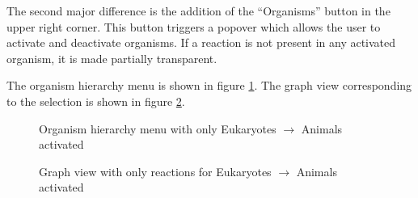 The second major difference is the addition of the ``Organisms'' button in the
upper right corner. This button triggers a popover which allows the user to
activate and deactivate organisms. If a reaction is not present in any activated
organism, it is made partially transparent.

The organism hierarchy menu is shown in figure
\ref{fig:kegg_screenshot_animals_only_list}. The graph view corresponding to the
selection is shown in figure \ref{fig:kegg_screenshot_animals_only_graph}.

\begin{figure}[hbtp]
    \caption{\label{fig:kegg_screenshot_animals_only_list} Organism hierarchy
    menu with only Eukaryotes $\rightarrow$ Animals activated}
\end{figure}

\begin{figure}[hbtp]
    \caption{\label{fig:kegg_screenshot_animals_only_graph} Graph view with only
    reactions for Eukaryotes $\rightarrow$ Animals activated}
\end{figure}

